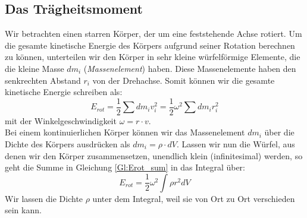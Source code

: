 \subsection{Das Trägheitsmoment}

Wir betrachten einen starren Körper, der um eine feststehende Achse rotiert. Um die gesamte kinetische Energie des Körpers aufgrund seiner Rotation berechnen zu können, unterteilen wir den Körper in sehr kleine würfelförmige Elemente, die die kleine Masse $dm_i$ (\textit{Massenelement}) haben. Diese Massenelemente haben den senkrechten Abstand $r_i$ von der Drehachse. Somit können wir die gesamte kinetische Energie schreiben als:
\begin{equation}
\label{Gl:Erot_sum}
E_{rot} = \frac{1}{2} \sum{dm_i v_i^2} = \frac{1}{2} \omega^2 \sum{dm_i r_i^2}
\end{equation}
mit der Winkelgeschwindigkeit $\omega = r\cdot v$.\\
Bei einem kontinuierlichen Körper können wir das Massenelement $dm_i$ über die Dichte des Körpers ausdrücken als $dm_i = \rho\cdot dV$. Lassen wir nun die Würfel, aus denen wir den Körper zusammensetzen, unendlich klein (infinitesimal) werden, so geht die Summe in Gleichung \ref{Gl:Erot_sum} in das Integral über:
\begin{equation}
\label{Gl:Erot_integral}
E_{rot} = \frac{1}{2}\omega^2\int{\rho r^2 dV}
\end{equation}
%
Wir lassen die Dichte $\rho$ unter dem Integral, weil sie von Ort zu Ort verschieden sein kann. \\

